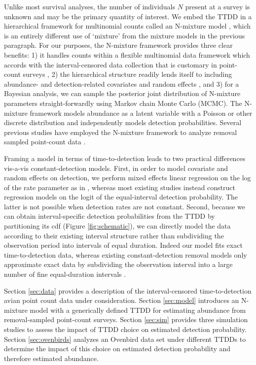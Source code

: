 \documentclass[12pt]{article}
\begin{document}
Unlike most survival analyses, the number of individuals $N$ present at a survey is unknown and may be the primary quantity of interest.  
We embed the TTDD in a hierarchical framework for multinomial counts called an N-mixture model \citep{Wyatt2002, Royle2004NMixture}, which is an entirely different use of `mixture' from the mixture models in the previous paragraph. 
For our purposes, the N-mixture framework provides three clear benefits: 1) it handles counts within a flexible multinomial data framework \citep{RoyleDorazio2006} which accords with the interval-censored data collection that is customary in point-count surveys \citep{Ralph1995}, 2) the hierarchical structure readily lends itself to including abundance- and detection-related covariates and random effects \citep{Dorazio2005, Etterson2009, Amundson2014}, and 3) for a Bayesian analysis, we can sample the posterior joint distribution of N-mixture parameters straight-forwardly using Markov chain Monte Carlo (MCMC).  
The N-mixture framework models abundance as a latent variable with a Poisson or other discrete distribution and independently models detection probabilities.  
Several previous studies have employed the N-mixture framework to analyze removal sampled point-count data  \citep{Royle2004Generalized, Dorazio2005, Etterson2009, Solymos2013, Amundson2014, Reidy2016}.  

Framing a model in terms of time-to-detection leads to two practical differences vis-a-vis constant-detection models.  
First, in order to model covariate and random effects on detection, we perform mixed effects linear regression on the log of the rate parameter as in \citet{Solymos2013}, whereas most existing studies instead construct regression models on the logit of the equal-interval detection probability.  
The latter is not possible when detection rates are not constant.  
Second, because we can obtain interval-specific detection probabilities from the TTDD by partitioning its cdf (Figure \ref{fig:schematic}), we can directly model the data according to their existing interval structure rather than subdividing the observation period into intervals of equal duration.  
Indeed our model fits exact time-to-detection data, whereas existing constant-detection removal models only approximate exact data by subdividing the observation interval into a large number of fine equal-duration intervals \citep{Reidy2011, Amundson2014}.


Section \ref{sec:data} provides a description of the interval-censored time-to-detection avian point count data under consideration.
Section \ref{sec:model} introduces an N-mixture model with a generically defined TTDD for estimating abundance from removal-sampled point-count surveys.
Section \ref{sec:sim} provides three simulation studies to assess the impact of TTDD choice on estimated detection probability. 
Section \ref{sec:ovenbirds} analyzes an Ovenbird data set under different TTDDs to determine the impact of this choice on estimated detection probability and therefore estimated abundance.
\end{document}
